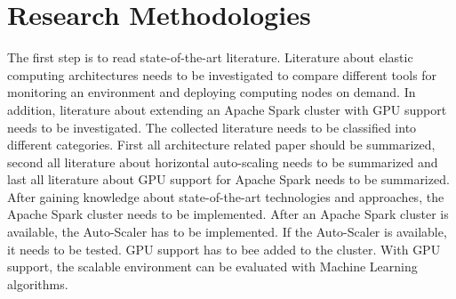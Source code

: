 \section{Research Methodologies}
The first step is to read state-of-the-art literature. Literature about elastic computing architectures needs to be investigated to compare different tools for monitoring an environment and deploying computing nodes on demand.
In addition, literature about extending an Apache Spark cluster with GPU support needs to be investigated.
The collected literature needs to be classified into different categories. First all architecture related paper should be summarized, second all literature about horizontal auto-scaling needs to be summarized and last all literature about GPU support for Apache Spark needs to be summarized.
After gaining knowledge about state-of-the-art technologies and approaches, the Apache Spark cluster needs to be implemented.
After an Apache Spark cluster is available, the Auto-Scaler has to be implemented.
If the Auto-Scaler is available, it needs to be tested.
GPU support has to bee added to the cluster.
With GPU support, the scalable environment can be evaluated with Machine Learning algorithms.
